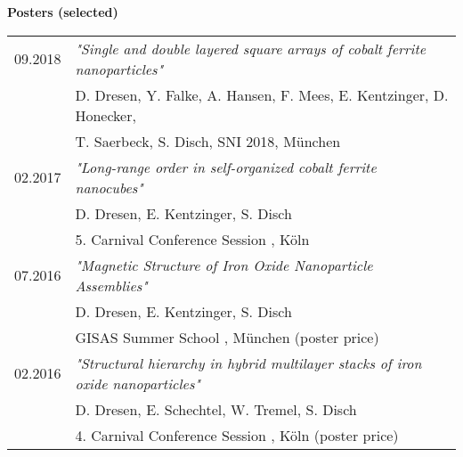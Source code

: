 \documentclass[\main/dresen_thesis.tex]{subfiles}
\begin{document}
	\noindent \textbf{Posters (selected)}
	\begin{table}[htbp]
		\begin{tabular}{p{2cm}l}
			09.2018       & \textit{"Single and double layered square arrays of cobalt ferrite nanoparticles"}\\
										& D. Dresen, Y. Falke, A. Hansen, F. Mees, E. Kentzinger, D. Honecker,\\
										& T. Saerbeck, S. Disch, SNI 2018, M\"unchen \\
			02.2017       & \textit{"Long-range order in self-organized cobalt ferrite nanocubes"}\\
										& D. Dresen, E. Kentzinger, S. Disch\\
										& 5. Carnival Conference Session , K{\"o}ln \\
			07.2016       & \textit{"Magnetic Structure of Iron Oxide Nanoparticle Assemblies"}\\
										& D. Dresen, E. Kentzinger, S. Disch\\
										& GISAS Summer School , M\"unchen (poster price)\\
			02.2016       & \textit{"Structural hierarchy in hybrid multilayer stacks of iron oxide nanoparticles"}\\
										& D. Dresen, E. Schechtel, W. Tremel, S. Disch\\
										& 4. Carnival Conference Session , K{\"o}ln (poster price)\\
		\end{tabular}
	\end{table}%
\end{document}
